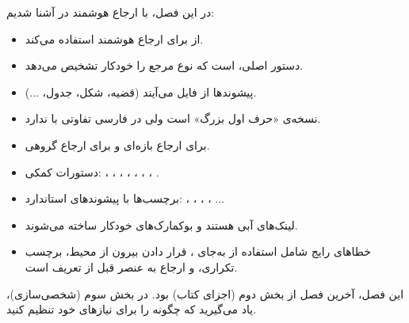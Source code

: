 در این فصل، با ارجاع هوشمند در 
آشنا شدیم:

\begin{itemize}
    \item {} از  برای
    ارجاع هوشمند استفاده می‌کند.

    \item دستور اصلی،  است که نوع
    مرجع را خودکار تشخیص می‌دهد.

    \item پیشوندها از فایل 
    می‌آیند (قضیه، شکل، جدول، ...).

    \item {} نسخه‌ی «حرف اول بزرگ» است
    ولی در فارسی تفاوتی با  ندارد.

    \item {} برای ارجاع بازه‌ای
    و  برای ارجاع گروهی.

    \item دستورات کمکی: ،
    ، ، ،
    ، ، ،
    .

    \item برچسب‌ها با پیشوندهای استاندارد:
    ، ، ، ،
    ...

    \item لینک‌های  آبی هستند
    و بوکمارک‌های  خودکار ساخته
    می‌شوند.

    \item خطاهای رایج شامل استفاده از
     به‌جای ، قرار دادن
     بیرون از محیط، برچسب
    تکراری، و ارجاع به عنصر قبل از تعریف
    است.
\end{itemize}

این فصل، آخرین فصل از بخش دوم (اجزای کتاب)
بود. در بخش سوم (شخصی‌سازی)، یاد می‌گیرید
که چگونه  را برای نیازهای
خود تنظیم کنید.
